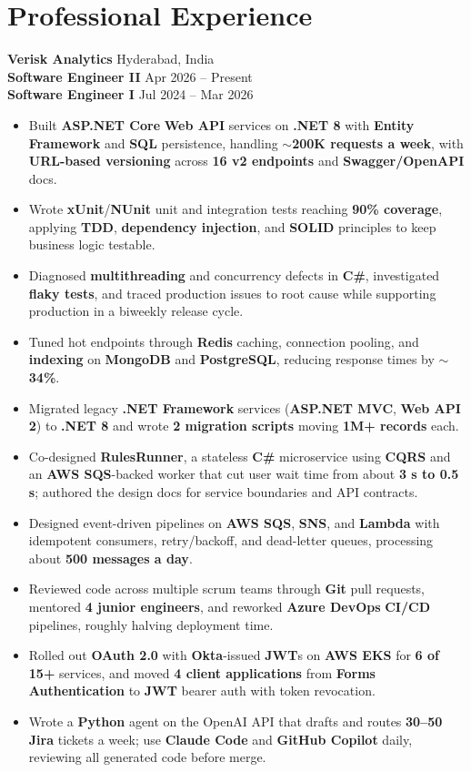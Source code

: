 \documentclass[a4paper,10pt]{article}
\begin{document}
\section*{Professional Experience}

\textbf{Verisk Analytics} \hfill Hyderabad, India \\
\textbf{Software Engineer II} \hfill Apr 2026 -- Present \\
\textbf{Software Engineer I} \hfill Jul 2024 -- Mar 2026

\begin{itemize}[leftmargin=*]
    \item Built \textbf{ASP.NET Core} \textbf{Web API} services on \textbf{.NET 8} with \textbf{Entity Framework} and \textbf{SQL} persistence, handling \textbf{${\sim}$200K requests a week}, with \textbf{URL-based versioning} across \textbf{16 v2 endpoints} and \textbf{Swagger/OpenAPI} docs.
    \item Wrote \textbf{xUnit}/\textbf{NUnit} unit and integration tests reaching \textbf{90\% coverage}, applying \textbf{TDD}, \textbf{dependency injection}, and \textbf{SOLID} principles to keep business logic testable.
    \item Diagnosed \textbf{multithreading} and concurrency defects in \textbf{C\#}, investigated \textbf{flaky tests}, and traced production issues to root cause while supporting production in a biweekly release cycle.
    \item Tuned hot endpoints through \textbf{Redis} caching, connection pooling, and \textbf{indexing} on \textbf{MongoDB} and \textbf{PostgreSQL}, reducing response times by ${\sim}$\textbf{34\%}.
    \item Migrated legacy \textbf{.NET Framework} services (\textbf{ASP.NET MVC}, \textbf{Web API 2}) to \textbf{.NET 8} and wrote \textbf{2 migration scripts} moving \textbf{1M+ records} each.
    \item Co-designed \textbf{RulesRunner}, a stateless \textbf{C\#} microservice using \textbf{CQRS} and an \textbf{AWS SQS}-backed worker that cut user wait time from about \textbf{3 s to 0.5 s}; authored the design docs for service boundaries and API contracts.
    \item Designed event-driven pipelines on \textbf{AWS SQS}, \textbf{SNS}, and \textbf{Lambda} with idempotent consumers, retry/backoff, and dead-letter queues, processing about \textbf{500 messages a day}.
    \item Reviewed code across multiple scrum teams through \textbf{Git} pull requests, mentored \textbf{4 junior engineers}, and reworked \textbf{Azure DevOps} \textbf{CI/CD} pipelines, roughly halving deployment time.
    \item Rolled out \textbf{OAuth 2.0} with \textbf{Okta}-issued \textbf{JWT}s on \textbf{AWS EKS} for \textbf{6 of 15+} services, and moved \textbf{4 client applications} from \textbf{Forms Authentication} to \textbf{JWT} bearer auth with token revocation.
    \item Wrote a \textbf{Python} agent on the OpenAI API that drafts and routes \textbf{30--50 Jira} tickets a week; use \textbf{Claude Code} and \textbf{GitHub Copilot} daily, reviewing all generated code before merge.
\end{itemize}
\end{document}
